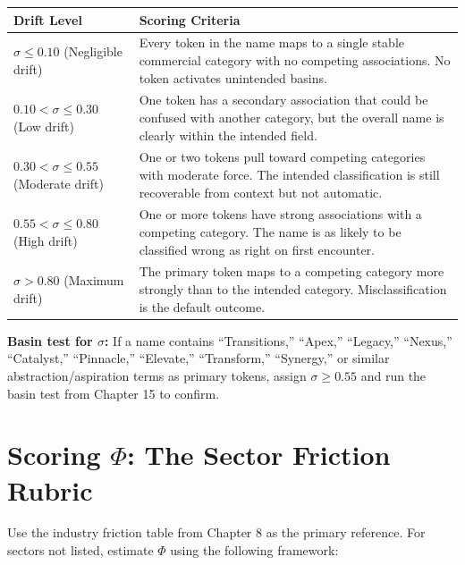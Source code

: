 \documentclass[12pt, openany]{book}
\theoremstyle{thmstyle}
\theoremstyle{defstyle}
\begin{document}
\begin{center}
\begin{tabular}{p{2.2in}p{3.3in}}
\toprule
\textbf{Drift Level} & \textbf{Scoring Criteria} \\
\midrule
$\sigma \leq 0.10$ (Negligible drift) &
Every token in the name maps to a single stable commercial category with no competing associations. No token activates unintended basins. \\[4pt]
$0.10 < \sigma \leq 0.30$ (Low drift) &
One token has a secondary association that could be confused with another category, but the overall name is clearly within the intended field. \\[4pt]
$0.30 < \sigma \leq 0.55$ (Moderate drift) &
One or two tokens pull toward competing categories with moderate force. The intended classification is still recoverable from context but not automatic. \\[4pt]
$0.55 < \sigma \leq 0.80$ (High drift) &
One or more tokens have strong associations with a competing category. The name is as likely to be classified wrong as right on first encounter. \\[4pt]
$\sigma > 0.80$ (Maximum drift) &
The primary token maps to a competing category more strongly than to the intended category. Misclassification is the default outcome. \\
\bottomrule
\end{tabular}
\end{center}

\textbf{Basin test for $\sigma$:} If a name contains ``Transitions,'' ``Apex,'' ``Legacy,'' ``Nexus,'' ``Catalyst,'' ``Pinnacle,'' ``Elevate,'' ``Transform,'' ``Synergy,'' or similar abstraction/aspiration terms as primary tokens, assign $\sigma \geq 0.55$ and run the basin test from Chapter 15 to confirm.

\section{Scoring $\Phi$: The Sector Friction Rubric}

Use the industry friction table from Chapter 8 as the primary reference. For sectors not listed, estimate $\Phi$ using the following framework:
\end{document}
